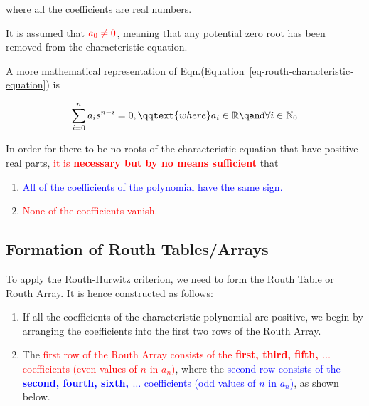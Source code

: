 \documentclass[
  14pt,
  a4paper,
  oneside,
  open=any,
  a4paper,
  14pt]{report}
\begin{document}
where all the coefficients are real numbers.

It is assumed that \(\textcolor{red}{a_0 \neq 0}\), meaning that any
potential zero root has been removed from the characteristic equation.

A more mathematical representation of
Eqn.(Equation~\ref{eq-routh-characteristic-equation}) is

\[
    \sum\limits_{i=0}^{n} a_i s^{n-i} = 0, \qqtext{where} a_i \in \mathbb{R} \qand \forall i \in \mathbb{N}_0
\]

In order for there to be no roots of the characteristic equation that
have positive real parts, \textcolor{red}{it is \textbf{necessary but by
no means sufficient}} that

\begin{enumerate}
\def\labelenumi{\arabic{enumi}.}
\item
  \textcolor{blue}{All of the coefficients of the polynomial have the
  same sign.}
\item
  \textcolor{red}{None of the coefficients vanish.}
\end{enumerate}

\subsection{Formation of Routh
Tables/Arrays}\label{formation-of-routh-tablesarrays}

To apply the Routh-Hurwitz criterion, we need to form the Routh Table or
Routh Array. It is hence constructed as follows:

\begin{enumerate}
\def\labelenumi{\arabic{enumi}.}
\item
  If all the coefficients of the characteristic polynomial are positive,
  we begin by arranging the coefficients into the first two rows of the
  Routh Array.
\item
  The \textcolor{red}{first row of the Routh Array consists of the
  \textbf{first, third, fifth, \(\ldots\)} coefficients (even values of
  \(n\) in \(a_n\))}, where the \textcolor{blue}{second row consists of
  the \textbf{second, fourth, sixth, \(\ldots\)} coefficients (odd
  values of \(n\) in \(a_n\))}, as shown below.
\end{enumerate}
\end{document}
